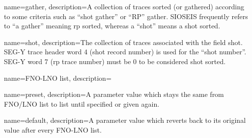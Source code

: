 \usepackage[acronym,toc,acronymlists={acronym,notation},hyperfirst=false]{glossaries}
\usepackage{glossaries-extra}



\makeglossaries

{
name={gather},
description={A collection of traces sorted (or gathered) according to some
criteria such as ``shot gather'' or ``RP'' gather.  SIOSEIS frequently refers
to ``a gather'' meaning rp sorted, whereas a ``shot'' means a shot sorted.}
}
 
{
    name={shot},
    description={The collection of traces associated with the field shot.  SEG-Y
trace header word 4 (shot record number) is used for the ``shot number''.  SEG-Y
word 7 (rp trace number) must be 0 to be considered shot sorted.}
}

{
name={FNO-LNO list},
description={}
}

{
    name={preset},
    description={A parameter value which stays the same from FNO/LNO list to
    list until specified or given again.}
}

{
    name={default},
    description={A parameter value which reverts back to its original value
    after every FNO-LNO list.}
}


